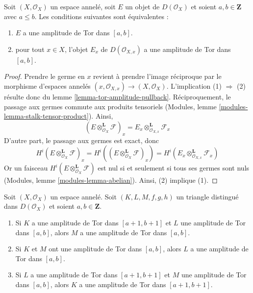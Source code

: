 {\begin{lemma}

\label{lemma-tor-amplitude-stalk}
Soit $(X, \mathcal{O}_X)$ un espace annelé, soit $E$ un objet de $D(\mathcal{O}_X)$ et soient $a, b \in \mathbf{Z}$ avec $a \leq b$. Les conditions suivantes sont équivalentes :
\begin{enumerate}
\item $E$ a une amplitude de Tor dans $[a, b]$.
\item pour tout $x \in X$, l'objet $E_x$ de $D(\mathcal{O}_{X, x})$ a une amplitude de Tor dans $[a, b]$.
\end{enumerate}

\end{lemma}

\begin{proof}
Prendre le germe en $x$ revient à prendre l'image réciproque par le morphisme d'espaces annelés $(x, \mathcal{O}_{X, x}) \to (X, \mathcal{O}_X)$. L'implication (1) $\Rightarrow$ (2) résulte donc du lemme \ref{lemma-tor-amplitude-pullback}. Réciproquement, le passage aux germes commute aux produits tensoriels (Modules, lemme \ref{modules-lemma-stalk-tensor-product}). Ainsi, $$
(E \otimes_{\mathcal{O}_X}^\mathbf{L} \mathcal{F})_x =
E_x \otimes_{\mathcal{O}_{X, x}}^\mathbf{L} \mathcal{F}_x
$$ D'autre part, le passage aux germes est exact, donc $$
H^i(E \otimes_{\mathcal{O}_X}^\mathbf{L} \mathcal{F})_x =
H^i((E \otimes_{\mathcal{O}_X}^\mathbf{L} \mathcal{F})_x) =
H^i(E_x \otimes_{\mathcal{O}_{X, x}}^\mathbf{L} \mathcal{F}_x)
$$ Or un faisceau $H^i(E \otimes_{\mathcal{O}_X}^\mathbf{L} \mathcal{F})$ est nul si et seulement si tous ses germes sont nuls (Modules, lemme \ref{modules-lemma-abelian}). Ainsi, (2) implique (1).
\end{proof}
\begin{lemma}

\label{lemma-cone-tor-amplitude}

Soit $(X, \mathcal{O}_X)$ un espace annelé. Soit $(K, L, M, f, g, h)$ un triangle distingué dans $D(\mathcal{O}_X)$ et soient $a, b \in \mathbf{Z}$.

\begin{enumerate}

\item Si $K$ a une amplitude de Tor dans $[a + 1, b + 1]$ et
$L$ une amplitude de Tor dans $[a, b]$, alors $M$ a une amplitude de Tor dans $[a, b]$.
\item Si $K$ et $M$ ont une amplitude de Tor dans $[a, b]$, alors
$L$ a une amplitude de Tor dans $[a, b]$.
\item Si $L$ a une amplitude de Tor dans $[a + 1, b + 1]$
et $M$ une amplitude de Tor dans $[a, b]$, alors
$K$ a une amplitude de Tor dans $[a + 1, b + 1]$.


\end{enumerate}
\end{lemma}}
